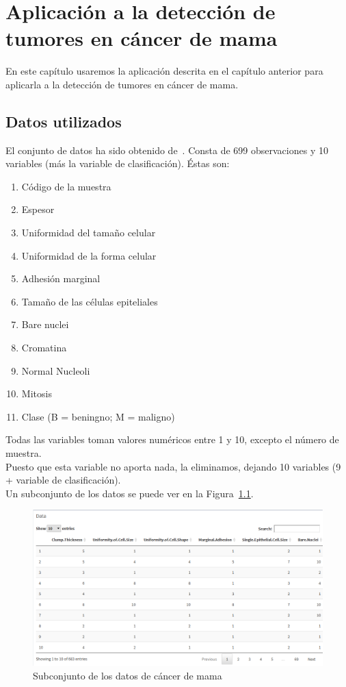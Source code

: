 \chapter[Aplicación al cáncer de mama]{Aplicación a la detección de tumores en cáncer de mama}

En este capítulo usaremos la aplicación descrita en el capítulo anterior para aplicarla a la detección de tumores en cáncer de mama.

\section{Datos utilizados}

El conjunto de datos ha sido obtenido de~\cite{cancer}. Consta de 699 observaciones y 10 variables (más la variable de clasificación). Éstas son:

\begin{enumerate}
	\item Código de la muestra
	\item Espesor
	\item Uniformidad del tamaño celular
	\item Uniformidad de la forma celular
	\item Adhesión marginal
	\item Tamaño de las células epiteliales
	\item Bare nuclei
	\item Cromatina
	\item Normal Nucleoli
	\item Mitosis
	\item Clase (B = beningno; M = maligno)
\end{enumerate}

Todas las variables toman valores numéricos entre 1 y 10, excepto el número de muestra.\\

Puesto que esta variable no aporta nada, la eliminamos, dejando 10 variables (9 + variable de clasificación).\\

Un subconjunto de los datos se puede ver en la Figura~\ref{fig:datos_cancer}.\\

\begin{figure}[tbph!]
\centering
\includegraphics[width=0.6\linewidth]{imagenes/cancer/datos.png}
\caption{Subconjunto de los datos de cáncer de mama}
\label{fig:datos_cancer}
\end{figure}

